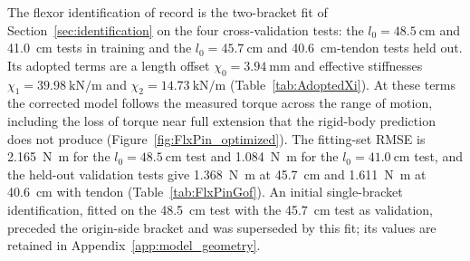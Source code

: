 The flexor identification of record is the two-bracket fit of Section~\ref{sec:identification} on the four cross-validation tests: the $l_{0}=\qty{48.5}{\cm}$ and \qty{41.0}{\cm} tests in training and the $l_{0}=\qty{45.7}{\cm}$ and \qty{40.6}{\cm}-tendon tests held out. Its adopted terms are a length offset $\chi_{0} = \qty{+3.94}{\mm}$ and effective stiffnesses $\chi_{1} = \qty{39.98}{\kN\per\m}$ and $\chi_{2} = \qty{14.73}{\kN\per\m}$ (Table~\ref{tab:AdoptedXi}). At these terms the corrected model follows the measured torque across the range of motion, including the loss of torque near full extension that the rigid-body prediction does not produce (Figure~\ref{fig:FlxPin_optimized}). The fitting-set RMSE is \qty{2.165}{\newton\meter} for the $l_{0}=\qty{48.5}{\cm}$ test and \qty{1.084}{\newton\meter} for the $l_{0}=\qty{41.0}{\cm}$ test, and the held-out validation tests give \qty{1.368}{\newton\meter} at \qty{45.7}{\cm} and \qty{1.611}{\newton\meter} at \qty{40.6}{\cm} with tendon (Table~\ref{tab:FlxPinGof}). An initial single-bracket identification, fitted on the \qty{48.5}{\cm} test with the \qty{45.7}{\cm} test as validation, preceded the origin-side bracket and was superseded by this fit; its values are retained in Appendix~\ref{app:model_geometry}.
